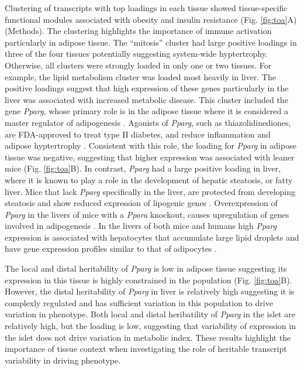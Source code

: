 \documentclass[
]{article}
\begin{document}
Clustering of transcripts with top loadings in each tissue showed
tissue-specific functional modules associated with obesity and insulin
resistance (Fig. \ref{fig:toa}A) (Methods). The clustering highlights
the importance of immune activation particularly in adipose tissue. The
``mitosis'' cluster had large positive loadings in three of the four
tissues potentially suggesting system-wide hyptertrophy. Otherwise, all
clusters were strongly loaded in only one or two tissues. For example,
the lipid metabolism cluster was loaded most heavily in liver. The
positive loadings suggest that high expression of these genes
particularly in the liver was associated with increased metabolic
disease. This cluster included the gene \textit{Pparg}, whose primary
role is in the adipose tissue where it is considered a master regulator
of adipogenesis \cite{pmid17389767}. Agonists of \textit{Pparg}, such as
thiazolidinediones, are FDA-approved to treat type II diabetes, and
reduce inflammation and adipose hyptertrophy \cite{pmid17389767}.
Consistent with this role, the loading for \textit{Pparg} in adipose
tissue was negative, suggesting that higher expression was associated
with leaner mice (Fig. \ref{fig:toa}B). In contrast, \textit{Pparg} had
a large positive loading in liver, where it is known to play a role in
the development of hepatic steatosis, or fatty liver. Mice that lack
\textit{Pparg} specifically in the liver, are protected from developing
steatosis and show reduced expression of lipogenic genes
\cite{pmid12805374, pmid12618528}. Overexpression of \textit{Pparg} in
the livers of mice with a \textit{Ppara} knockout, causes upregulation
of genes involved in adipogenesis \cite{pmid16357043}. In the livers of
both mice and humans high \textit{Pparg} expression is associated with
hepatocytes that accumulate large lipid droplets and have gene
expression profiles similar to that of adipocytes
\cite{pmid15644454, pmid16403437}.

The local and distal heritability of \textit{Pparg} is low in adipose
tissue suggesting its expression in this tissue is highly constrained in
the population (Fig. \ref{fig:toa}B). However, the distal heritability
of \textit{Pparg} in liver is relatively high suggesting it is complexly
regulated and has sufficient variation in this population to drive
variation in phenotype. Both local and distal heribatility of
\textit{Pparg} in the islet are relatively high, but the loading is low,
suggesting that variability of expression in the islet does not drive
variation in metabolic index. These results highlight the importance of
tissue context when investigating the role of heritable transcript
variability in driving phenotype.
\end{document}

